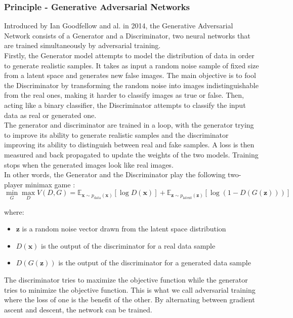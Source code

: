 \documentclass{article}
\begin{document}
\subsubsection*{Principle - Generative Adversarial Networks}
\quad Introduced by Ian Goodfellow and al. in 2014, the Generative Adversarial Network consists of a Generator and a Discriminator, two neural networks that are trained simultaneously by adversarial training. \\
Firstly, the Generator model attempts to model the distribution of data in order to generate realistic samples. 
It takes as input a random noise sample of fixed size from a latent space and generates new false images. 
The main objective is to fool the Discriminator by transforming the random noise into images indistinguishable from the real ones, making it harder to classify images as true or false. 
Then, acting like a binary classifier, the Discriminator attempts to classify the input data as real or generated one. \\

The generator and discriminator are trained in a loop, with the generator trying to improve its ability to generate realistic samples and the discriminator improving its ability to distinguish between real and fake samples. 
A loss is then measured and back propagated to update the weights of the two models. 
Training stops when the generated images look like real images.\\
In other words, the Generator and the Discriminator play the following two-player minimax game :
$$ \min_G \max_D V(D, G) = \mathbb{E}_{\mathbf{x} \sim p_{\text{data}}(\mathbf{x})} [\log D(\mathbf{x})] + \mathbb{E}_{\mathbf{z} \sim p_{\text{latent}}(\mathbf{z})} [\log (1 - D(G(\mathbf{z})))] $$

where:

\begin{itemize}
    \item $\mathbf{z}$ is a random noise vector drawn from the latent space distribution 
    \item $D(\mathbf{x})$ is the output of the discriminator for a real data sample
    \item $D(G(\mathbf{z}))$ is the output of the discriminator for a generated data sample
\end{itemize}

The discriminator tries to maximize the objective function while the generator tries to minimize the objective function. This is what we call adversarial training where the loss of one is the benefit of the other. By alternating between gradient ascent and descent, the network can be trained.\\
\end{document}
